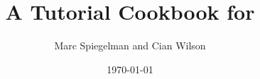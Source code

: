 


\makeatletter
\def\maketitle{%
  \null
  \thispagestyle{empty}%
  \vfill
  \begin{center}\leavevmode
    \normalfont
    {\LARGE\raggedleft \@author\par}%
    \hrulefill\par
    {\huge\raggedright \@title\par}%
    \vskip 1cm
    \texttt{[image: figures/1dto3dwaves.pdf]}\\
    \vskip 0.5cm
    {\Large Version 1.0\par}%
    {\Large \@date\par}%
  \end{center}%
  \vfill
  \null
  \cleardoublepage
  }
\makeatother
\author{Marc Spiegelman and Cian Wilson}
\title{A Tutorial Cookbook for \TF{}}
\date{\today}

\pagestyle{ruled} %


\setcounter{tocdepth}{2}

\renewcommand{\sc}{}





